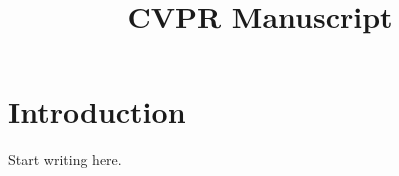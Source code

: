 \documentclass[10pt,twocolumn]{article}
\title{CVPR Manuscript}
\author{}
\date{}
\begin{document}
\maketitle
\section{Introduction}
Start writing here.


\end{document}
